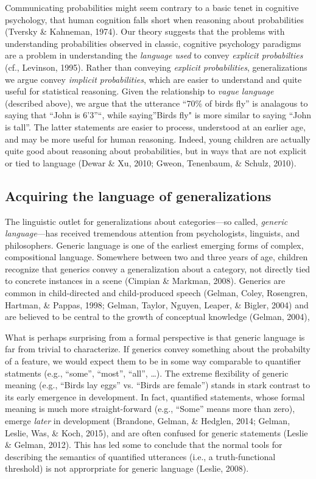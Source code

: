 \documentclass[english,floatsintext,man]{apa6}
\theoremstyle{definition}
\theoremstyle{definition}
\theoremstyle{definition}
\theoremstyle{remark}
\begin{document}
Communicating probabilities might seem contrary to a basic tenet in
cognitive psychology, that human cognition falls short when reasoning
about probabilities (Tversky \& Kahneman, 1974). Our theory suggests
that the problems with understanding probabilities observed in classic,
cognitive psychology paradigms are a problem in understanding the
\emph{language used} to convey \emph{explicit probabilties} (cf.,
Levinson, 1995). Rather than conveying \emph{explicit probabilities},
generalizations we argue convey \emph{implicit probabilities}, which are
easier to understand and quite useful for statistical reasoning. Given
the relationship to \emph{vague language} (described above), we argue
that the utterance \enquote{70\% of birds fly} is analagous to saying
that \enquote{John is 6'3}\enquote{, while saying}Birds fly" is more
similar to saying \enquote{John is tall}. The latter statements are
easier to process, understood at an earlier age, and may be more useful
for human reasoning. Indeed, young children are actually quite good
about reasoning about probabilities, but in ways that are not explicit
or tied to language (Dewar \& Xu, 2010; Gweon, Tenenbaum, \& Schulz,
2010).

\subsection{Acquiring the language of
generalizations}\label{acquiring-the-language-of-generalizations}

The linguistic outlet for generalizations about categories---so called,
\emph{generic language}---has received tremendous attention from
psychologists, linguists, and philosophers. Generic language is one of
the earliest emerging forms of complex, compositional language.
Somewhere between two and three years of age, children recognize that
generics convey a generalization about a category, not directly tied to
concrete instances in a scene (Cimpian \& Markman, 2008). Generics are
common in child-directed and child-produced speech (Gelman, Coley,
Rosengren, Hartman, \& Pappas, 1998; Gelman, Taylor, Nguyen, Leaper, \&
Bigler, 2004) and are believed to be central to the growth of conceptual
knowledge (Gelman, 2004),

What is perhaps surprising from a formal perspective is that generic
language is far from trivial to characterize. If generics convey
something about the probabilty of a feature, we would expect them to be
in some way comparable to quantifier statments (e.g., \enquote{some},
\enquote{most}, \enquote{all}, \ldots{}). The extreme flexibility of
generic meaning (e.g., \enquote{Birds lay eggs} vs. \enquote{Birds are
female}) stands in stark contrast to its early emergence in development.
In fact, quantified statements, whose formal meaning is much more
straight-forward (e.g., \enquote{Some} means more than zero), emerge
\emph{later} in development (Brandone, Gelman, \& Hedglen, 2014; Gelman,
Leslie, Was, \& Koch, 2015), and are often confused for generic
statements (Leslie \& Gelman, 2012). This has led some to conclude that
the normal tools for describing the semantics of quantified utterances
(i.e., a truth-functional threshold) is not approrpriate for generic
language (Leslie, 2008).
\end{document}

